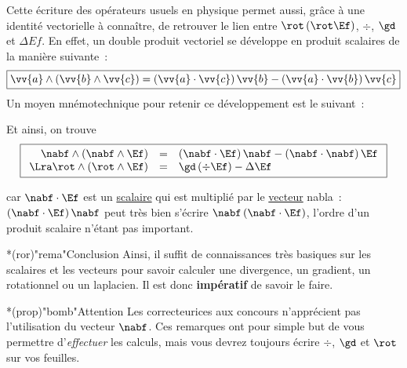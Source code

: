\documentclass[a4paper, 12pt, garamond]{book}
\begin{document}
Cette écriture des opérateurs usuels en physique permet aussi, grâce à une
identité vectorielle à connaître, de retrouver le lien entre
$\rot\left(\rot\Ef\right)$, $\div$, $\gd$ et $\Delta Ef$. En effet, un double
produit vectoriel se développe en produit scalaires de la manière suivante~:
\begin{equation*}
	\boxed{
		\vv{a}\wedge\left(\vv{b}\wedge\vv{c}\right) =
		\left(\vv{a}\cdot\vv{c}\right)\vv{b} -
		\left(\vv{a}\cdot\vv{b}\right)\vv{c}
	}
\end{equation*}
Un moyen mnémotechnique pour retenir ce développement est le suivant~:
\begin{center}
\end{center}
Et ainsi, on trouve
\textcolor{red}{
	\[
		\boxed{
			\begin{array}{rcl}
				\nabf\wedge\left(\nabf\wedge\Ef\right)
				 & = &
				\left(\nabf\cdot\Ef\right)\nabf - \left(\nabf\cdot\nabf\right)\Ef
				\\\Lra 
				\rot\wedge\left(\rot\wedge\Ef\right)
				 & = &
				\gd\left(\div\Ef\right) - \Delta \Ef
				\\
			\end{array}}
	\]
}

car $\nabf\cdot\Ef$ est un \ul{scalaire} qui est multiplié par le \ul{vecteur}
nabla~: $\left(\nabf\cdot\Ef\right)\nabf$ peut très bien s'écrire
$\nabf\left(\nabf\cdot\Ef\right)$, l'ordre d'un produit scalaire n'étant pas
important.

\begin{tcb}*(ror)"rema"{Conclusion}
	Ainsi, il suffit de connaissances très basiques sur les scalaires et les
	vecteurs pour savoir calculer une divergence, un gradient, un rotationnel ou
	un laplacien. Il est donc \textbf{impératif} de savoir le faire.
\end{tcb}

\begin{tcb}*(prop)"bomb"{Attention}
	Les correcteurices aux concours n'apprécient pas l'utilisation du vecteur
	$\nabf$. Ces remarques ont pour simple but de vous permettre
	d'\textit{effectuer} les calculs, mais vous devrez toujours écrire $\div$,
	$\gd$ et $\rot$ sur vos feuilles.
\end{tcb}
\end{document}
